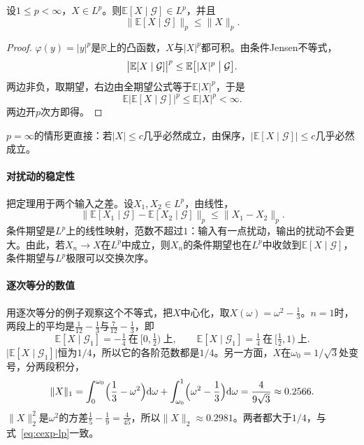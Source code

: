 \begin{theorem}[\texorpdfstring{$L^{p}$}{Lp}收缩]
\label{thm:cexp-lp}
设$1\leq p<\infty$，$X\in L^{p}$。则$\mathbb{E}[X\mid\mathcal{G}]\in L^{p}$，并且
\begin{equation}
 \bigl\lVert\mathbb{E}[X\mid\mathcal{G}]\bigr\rVert_p\leq\lVert X\rVert_p .
 \label{eq:cexp-lp}
\end{equation}
\end{theorem}

\begin{proof}
$\varphi(y)=\lvert y\rvert^{p}$是$\mathbb{R}$上的凸函数，$X$与$\lvert X\rvert^{p}$都可积。由条件Jensen不等式，
\[
 \bigl\lvert\mathbb{E}[X\mid\mathcal{G}]\bigr\rvert^{p}\leq\mathbb{E}\bigl[\lvert X\rvert^{p}\bigm|\mathcal{G}\bigr].
\]
两边非负，取期望，右边由全期望公式等于$\mathbb{E}\lvert X\rvert^{p}$，于是
\[
 \mathbb{E}\bigl\lvert\mathbb{E}[X\mid\mathcal{G}]\bigr\rvert^{p}\leq\mathbb{E}\lvert X\rvert^{p}<\infty .
\]
两边开$p$次方即得。
\end{proof}

$p=\infty$的情形更直接：若$\lvert X\rvert\leq c$几乎必然成立，由保序，$\lvert\mathbb{E}[X\mid\mathcal{G}]\rvert\leq c$几乎必然成立。

\paragraph{对扰动的稳定性}
把定理用于两个输入之差。设$X_1,X_2\in L^{p}$，由线性，
\begin{equation}
 \bigl\lVert\mathbb{E}[X_1\mid\mathcal{G}]-\mathbb{E}[X_2\mid\mathcal{G}]\bigr\rVert_p\leq\lVert X_1-X_2\rVert_p .
 \label{eq:cexp-lp-stability}
\end{equation}
条件期望是$L^{p}$上的线性映射，范数不超过$1$：输入有一点扰动，输出的扰动不会更大。由此，若$X_n\to X$在$L^{p}$中成立，则$X_n$的条件期望也在$L^{p}$中收敛到$\mathbb{E}[X\mid\mathcal{G}]$，条件期望与$L^{p}$极限可以交换次序。

\paragraph{逐次等分的数值}
用逐次等分的例子观察这个不等式，把$X$中心化，取$X(\omega)=\omega^{2}-\tfrac13$。$n=1$时，两段上的平均是$\tfrac1{12}-\tfrac13$与$\tfrac{7}{12}-\tfrac13$，即
\[
 \mathbb{E}[X\mid\mathcal{G}_1]=-\tfrac14\ \text{在}\ [0,\tfrac12)\ \text{上},\qquad
 \mathbb{E}[X\mid\mathcal{G}_1]=\tfrac14\ \text{在}\ [\tfrac12,1)\ \text{上}.
\]
$\lvert\mathbb{E}[X\mid\mathcal{G}_1]\rvert$恒为$1/4$，所以它的各阶范数都是$1/4$。另一方面，$X$在$\omega_0=1/\sqrt3$处变号，分两段积分，
\[
 \lVert X\rVert_1=\int_0^{\omega_0}\Bigl(\frac13-\omega^{2}\Bigr)\mathrm{d}\omega+\int_{\omega_0}^{1}\Bigl(\omega^{2}-\frac13\Bigr)\mathrm{d}\omega=\frac{4}{9\sqrt3}\approx0.2566 .
\]
$\lVert X\rVert_2^{2}$是$\omega^{2}$的方差$\tfrac15-\tfrac19=\tfrac4{45}$，所以$\lVert X\rVert_2\approx0.2981$。两者都大于$1/4$，与式~\eqref{eq:cexp-lp}一致。

